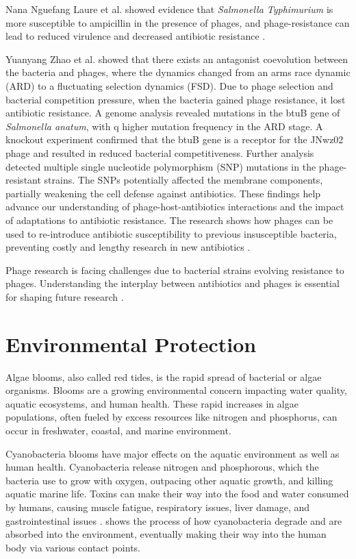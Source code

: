 Nana Nguefang Laure et al. showed evidence that \textit{Salmonella Typhimurium} is more susceptible to ampicillin in the presence of phages, and phage-resistance can lead to reduced virulence and decreased antibiotic resistance \cite{laurePhageResistancemediatedTradeoffs2022}. 

Yuanyang Zhao et al. showed that there exists an antagonist coevolution between the bacteria and phages, where the dynamics changed from an arms race dynamic (ARD) to a fluctuating selection dynamics (FSD).
Due to phage selection and bacterial competition pressure, when the bacteria gained phage resistance, it lost antibiotic resistance.
A genome analysis revealed mutations in the btuB gene of \textit{Salmonella anatum}, with q higher mutation frequency in the ARD stage.
A knockout experiment confirmed that the btuB gene is a receptor for the JNwz02 phage and resulted in reduced bacterial competitiveness.
Further analysis detected multiple single nucleotide polymorphism (SNP) mutations in the phage-resistant strains.
The SNPs potentially affected the membrane components, partially weakening the cell defense against antibiotics.
These findings help advance our understanding of phage-host-antibiotics interactions and the impact of adaptations to antibiotic resistance.
The research shows how phages can be used to re-introduce antibiotic susceptibility to previous insusceptible bacteria, preventing costly and lengthy research in new antibiotics \cite{zhaoPhagedrivenCoevolutionReveals2024}. \newline

Phage research is facing challenges due to bacterial strains evolving resistance to phages.
Understanding the interplay between antibiotics and phages is essential for shaping future research \cite{zhaoPhagedrivenCoevolutionReveals2024}.


\section{Environmental Protection}
Algae blooms, also called red tides, is the rapid spread of bacterial or algae organisms.
Blooms are a growing environmental concern impacting water quality, aquatic ecosystems, and human health.
These rapid increases in algae populations, often fueled by excess resources like nitrogen and phosphorus, can occur in freshwater, coastal, and marine environment. 

Cyanobacteria blooms have major effects on the aquatic environment as well as human health.
Cyanobacteria release nitrogen and phosphorous, which the bacteria use to grow with oxygen, outpacing other aquatic growth, and killing aquatic marine life.
Toxins can make their way into the food and water consumed by humans, causing muscle fatigue, respiratory issues, liver damage, and gastrointestinal issues \cite{zhangImpactCyanobacteriaBlooms2022}.
 shows the process of how cyanobacteria degrade and are absorbed into the environment, eventually making their way into the human body via various contact points.
 
